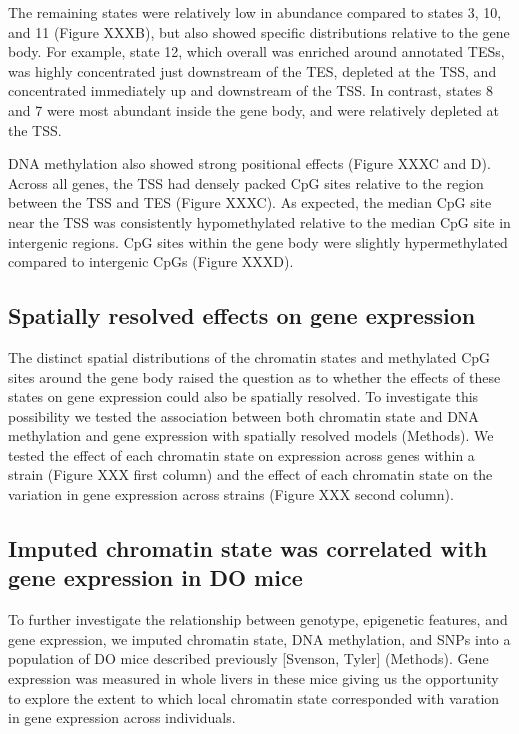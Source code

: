 \documentclass[10pt,letterpaper]{article}
\begin{document}
The remaining states were relatively low in abundance compared to states
3, 10, and 11 (Figure XXXB), but also showed specific distributions
relative to the gene body. For example, state 12, which overall was
enriched around annotated TESs, was highly concentrated just downstream
of the TES, depleted at the TSS, and concentrated immediately up and
downstream of the TSS. In contrast, states 8 and 7 were most abundant
inside the gene body, and were relatively depleted at the TSS.

DNA methylation also showed strong positional effects (Figure XXXC and
D). Across all genes, the TSS had densely packed CpG sites relative to
the region between the TSS and TES (Figure XXXC). As expected, the
median CpG site near the TSS was consistently hypomethylated relative to
the median CpG site in intergenic regions. CpG sites within the gene
body were slightly hypermethylated compared to intergenic CpGs (Figure
XXXD).

\hypertarget{spatially-resolved-effects-on-gene-expression}{%
\subsection{Spatially resolved effects on gene
expression}\label{spatially-resolved-effects-on-gene-expression}}

The distinct spatial distributions of the chromatin states and
methylated CpG sites around the gene body raised the question as to
whether the effects of these states on gene expression could also be
spatially resolved. To investigate this possibility we tested the
association between both chromatin state and DNA methylation and gene
expression with spatially resolved models (Methods). We tested the
effect of each chromatin state on expression across genes within a
strain (Figure XXX first column) and the effect of each chromatin state
on the variation in gene expression across strains (Figure XXX second
column).

\hypertarget{imputed-chromatin-state-was-correlated-with-gene-expression-in-do-mice}{%
\subsection{Imputed chromatin state was correlated with gene expression
in DO
mice}\label{imputed-chromatin-state-was-correlated-with-gene-expression-in-do-mice}}

To further investigate the relationship between genotype, epigenetic
features, and gene expression, we imputed chromatin state, DNA
methylation, and SNPs into a population of DO mice described previously
{[}Svenson, Tyler{]} (Methods). Gene expression was measured in whole
livers in these mice giving us the opportunity to explore the extent to
which local chromatin state corresponded with varation in gene
expression across individuals.
\end{document}
